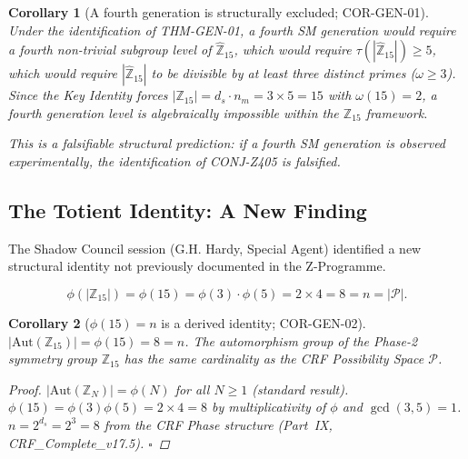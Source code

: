 \documentclass[12pt, a4paper]{article}
\newtheorem{corollary}{Corollary}[section]
\begin{document}
\begin{corollary}[A fourth generation is structurally excluded;
  COR-GEN-01]
\label{zc15:cor:no-fourth}
Under the identification of THM-GEN-01, a fourth SM generation
would require a fourth non-trivial subgroup level of
$\widehat{\mathbb{Z}}_{15}$, which would require
$\tau(|\widehat{\mathbb{Z}}_{15}|) \geq 5$, which would require
$|\widehat{\mathbb{Z}}_{15}|$ to be divisible by at least three
distinct primes ($\omega \geq 3$). Since the Key Identity forces
$|\mathbb{Z}_{15}| = d_s \cdot n_m = 3 \times 5 = 15$ with
$\omega(15) = 2$, a fourth generation level is algebraically
impossible within the $\mathbb{Z}_{15}$ framework.

\emph{This is a falsifiable structural prediction: if a fourth
SM generation is observed experimentally, the identification
of CONJ-Z405 is falsified.}
\end{corollary}

\subsection{The Totient Identity: A New Finding}
\label{zc15:sec:totient}

The Shadow Council session (G.H. Hardy, Special Agent) identified
a new structural identity not previously documented in the
Z-Programme.

\begin{formalbox}[title={EQ-GEN-04: Totient identity
  $\phi(15) = n$}]
\[
  \phi(|\mathbb{Z}_{15}|) = \phi(15) = \phi(3)\cdot\phi(5)
  = 2 \times 4 = 8 = n = |\mathcal{P}|.
  \tag{EQ-GEN-04}\label{zc15:eq:totient}
\]
\end{formalbox}

\begin{corollary}[$\phi(15) = n$ is a derived identity;
  COR-GEN-02]
\label{zc15:cor:totient}
$|\mathrm{Aut}(\mathbb{Z}_{15})| = \phi(15) = 8 = n$.
The automorphism group of the Phase-2 symmetry group
$\mathbb{Z}_{15}$ has the same cardinality as the CRF Possibility
Space $\mathcal{P}$.

\begin{proof}
$|\mathrm{Aut}(\mathbb{Z}_N)| = \phi(N)$ for all $N \geq 1$
(standard result). $\phi(15) = \phi(3)\phi(5) = 2 \times 4 = 8$
by multiplicativity of $\phi$ and $\gcd(3,5)=1$.
$n = 2^{d_s} = 2^3 = 8$ from the CRF Phase structure
(Part~IX, CRF\_Complete\_v17.5). \hfill$\square$
\end{proof}
\end{corollary}
\end{document}
